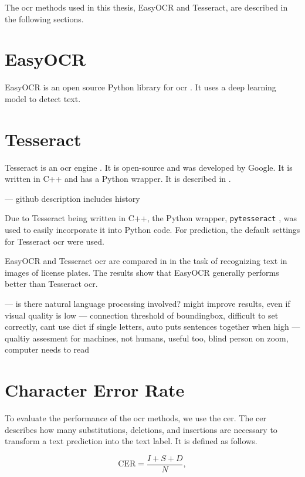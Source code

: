 The \gls{ocr} methods used in this thesis, EasyOCR and Tesseract, are described in the following sections.

\section{EasyOCR}
\label{subsec:easyocr}

EasyOCR is an open source Python library for \gls{ocr} \cite{easyocr_2020}. It uses a deep learning model to detect text.

\section{Tesseract}
\label{subsec:tesseract}

Tesseract is an \gls{ocr} engine \cite{tesseract_2007}. It is open-source and was developed by Google. It is written in C++ and has a Python wrapper.
It is described in \cite{ocr_survey_tess_2013}.

--- github description includes history

Due to Tesseract being written in C++, the Python wrapper, \texttt{pytesseract} \cite{pytesseract_2022}, was used to easily incorporate it into Python code.
For prediction, the default settings for Tesseract \gls{ocr} were used.

EasyOCR and Tesseract \gls{ocr} are compared in \cite{ocr_tess_vs_easyocr_2022} in the task of recognizing text in images of license plates.
The results show that EasyOCR generally performs better than Tesseract \gls{ocr}.


--- is there natural language processing involved? might improve results, even if visual quality is low
--- connection threshold of boundingbox, difficult to set correctly, cant use dict if single letters, auto puts sentences together when high
--- qualtiy assesment for machines, not humans, useful too, blind person on zoom, computer needs to read

\section{Character Error Rate}
\label{subsec:cer}

To evaluate the performance of the \gls{ocr} methods, we use the \gls{cer}.
The \gls{cer} \cite{cer_2022} describes how many substitutions, deletions, and insertions are necessary to transform a text prediction into the text label.
It is defined as follows.

\begin{equation}
    \text{CER} = \frac{I + S + D}{N},
    \label{eq:cer}
\end{equation}

